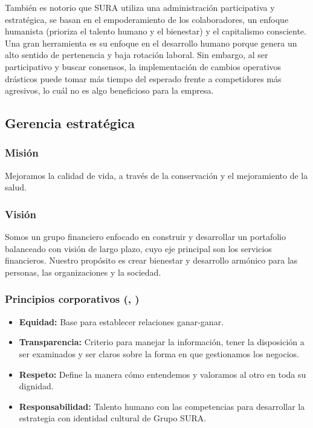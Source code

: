 \documentclass[onecolumn]{article} %
\begin{document}
	También es notorio que SURA utiliza una administración participativa y estratégica, se basan en el empoderamiento de los colaboradores, un enfoque humanista (prioriza el talento humano y el bienestar) y el capitalismo consciente. Una gran herramienta es su enfoque en el desarrollo humano porque genera un alto sentido de pertenencia y baja rotación laboral. Sin embargo, al ser participativo y buscar consensos, la implementación de cambios operativos drásticos puede tomar más tiempo del esperado frente a competidores más agresivos, lo cuál no es algo beneficioso para la empresa.
	
	\subsection{Gerencia estratégica}
	
	\subsubsection{Misión}
	Mejoramos la calidad de vida, a través de la conservación y el mejoramiento de la salud.
	
	\subsubsection{Visión}
	Somos un grupo financiero enfocado en construir y desarrollar un portafolio balanceado con visión de largo plazo, cuyo eje principal son los servicios financieros. Nuestro propósito es crear bienestar y desarrollo armónico para las personas, las organizaciones y la sociedad.
	
	\subsubsection{Principios corporativos (\cite{mp7}, \cite{mp8})}
	\begin{itemize}
		\item \textbf{Equidad:} Base para establecer relaciones ganar-ganar.
		\item \textbf{Transparencia:} Criterio para manejar la información, tener la disposición a ser examinados y ser claros sobre la forma en que gestionamos los negocios.
		\item \textbf{Respeto:} Define la manera cómo entendemos y valoramos al otro en toda su dignidad.
		\item \textbf{Responsabilidad:} Talento humano con las competencias para desarrollar la estrategia con identidad cultural de Grupo SURA.
	\end{itemize}
	
\end{document}

